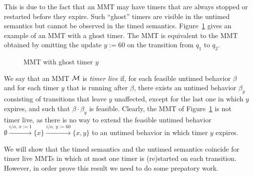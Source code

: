 This is due to the fact that an MMT may have timers that are always stopped or restarted before
they expire. Such ``ghost'' timers are visible in the untimed semantics but cannot be observed in the timed semantics.
\iflong
Figure~\ref{fig:ghosttimers} gives an example of an MMT with a ghost timer. The MMT is equivalent to the MMT obtained by 
omitting the update $y :=60$ on the transition from $q_1$ to $q_2$.
\begin{figure}
\begin{center}
\caption{MMT with ghost timer $y$}
\label{fig:ghosttimers}
\end{center}
\end{figure}
\fi
%
We say that an MMT ${\mathcal M}$ is \emph{timer live} if, for each feasible untimed behavior $\beta$ and for each timer $y$ that is running after $\beta$, there exists an untimed behavior $\beta_y$ consisting of transitions that leave $y$ unaffected, except for the last one in which $y$ expires, and such that $\beta \cdot \beta_y$ is feasible.
\iflong
Clearly, the MMT of Figure~\ref{fig:ghosttimers} is not timer live, as there is no way to extend the feasible untimed
behavior $\emptyset \xrightarrow{i/o,~ x:=1 } \{ x\} \xrightarrow{i/o,~ y:=60 } \{ x, y\}$ to an untimed behavior in which
timer $y$ expires.
\fi

We will show that the timed semantics and the untimed semantics coincide for timer live MMTs in which at most one timer is (re)started on each transition. However, in order prove this result we need to do some prepatory work.

